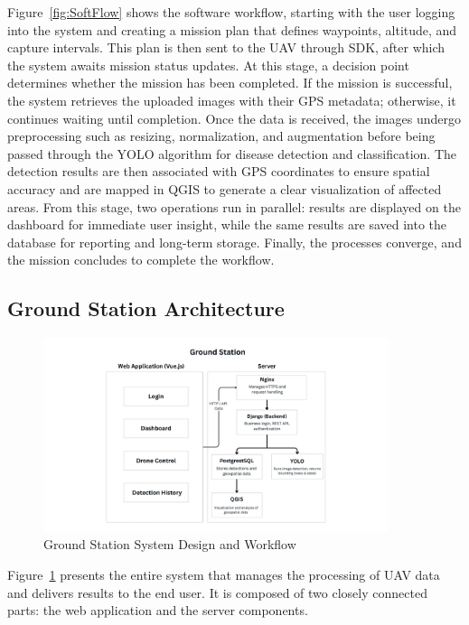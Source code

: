 Figure~\ref{fig:SoftFlow} shows the software workflow, starting with the user logging into the system and creating a mission plan that defines waypoints, altitude, and capture intervals. This plan is then sent to the UAV through SDK, after which the system awaits mission status updates. At this stage, a decision point determines whether the mission has been completed. If the mission is successful, the system retrieves the uploaded images with their GPS metadata; otherwise, it continues waiting until completion. Once the data is received, the images undergo preprocessing such as resizing, normalization, and augmentation before being passed through the YOLO algorithm for disease detection and classification. The detection results are then associated with GPS coordinates to ensure spatial accuracy and are mapped in QGIS to generate a clear visualization of affected areas. From this stage, two operations run in parallel: results are displayed on the dashboard for immediate user insight, while the same results are saved into the database for reporting and long-term storage. Finally, the processes converge, and the mission concludes to complete the workflow.

\subsection*{Ground Station Architecture}

\begin{figure}[H]
	\centering
	\caption{Ground Station System Design and Workflow}
	\label{fig:GroundStation}
	\includegraphics[width=0.9\textwidth]{figures/Ground_Station.pdf}
\end{figure}

Figure~\ref{fig:GroundStation} presents the entire system that manages the processing of UAV data and delivers results to the end user. It is composed of two closely connected parts: the web application and the server components.

